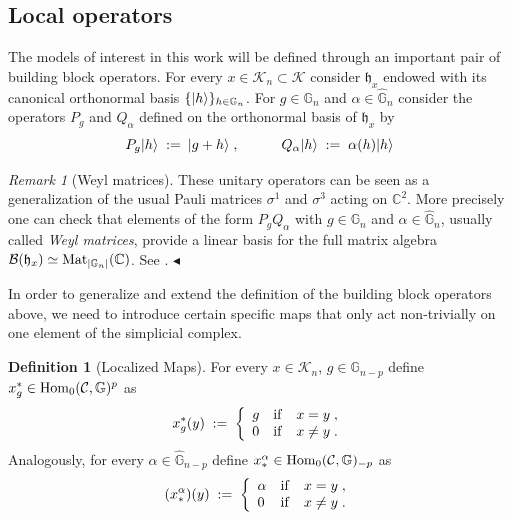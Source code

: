 \documentclass[a4paper,12pt,twoside,reqno]{amsart}
\DeclarePairedDelimiter\ket{\lvert}{\rangle}
\theoremstyle{plain}
\theoremstyle{definition}
\newtheorem{definition}[teo]{Definition}
\theoremstyle{remark}
\newtheorem{remark}[teo]{Remark}
\numberwithin{equation}{section}
\numberwithin{figure}{section}
\numberwithin{table}{section}
\newcommand{\f}[1]{\mathcal{#1}}
\newcommand{\n}[1]{\mathbb{#1}}
\begin{document}
	\subsection{Local operators}
	The models of interest in this work will be defined through an important pair of building block operators.
	For every  $x\in \f{K}_n\subset \f{K}$ consider $\mathfrak{h}_x$ endowed with its canonical
	orthonormal basis  $\{\ket{h}\}_{h\in \n{G}_n}$.
	For $g\in \n{G}_n$ and $\alpha\in \widehat{\n{G}}_n$ consider the operators $P_g$ and $Q_\alpha$
	defined on the orthonormal basis of $\mathfrak{h}_x$
	by
	\begin{equation*}
		P_g\ket{h}\;:=\:\ket{g+h}\;,\qquad\quad Q_{\alpha}\ket{h}\;:=\;\alpha(h)\ket{h}
	\end{equation*}
	
	
	
	
	
	
	
	\begin{remark}[Weyl matrices]\label{rk_lin_bas_mat}
		These unitary operators can be seen as a generalization of the usual Pauli matrices $\sigma^1$ and $\sigma^3$ acting on $\n{C}^2$.
		More precisely one can check that elements of the form $P_gQ_{\alpha}$ with $g\in \n{G}_n$ and $\alpha\in \widehat{\n{G}}_n$, usually called  \emph{Weyl matrices}, provide a linear basis for the full matrix algebra
		$\f{B}(\mathfrak{h}_x)\simeq{\rm Mat}_{|{\n{G}}_n|}(\n{C})$. See \cite[Lemma 3.2]{weil_operators}.
		\hfill $\blacktriangleleft$
	\end{remark}
	
	
	
	
	
	
	
	
	\medskip 
	
	
	
	
	
	
	
	
	In order to generalize and extend the definition of the building block operators above, we need to introduce
	certain specific maps that only act non-trivially on one element of the simplicial complex.
	\begin{definition}[Localized Maps]\label{def:localized maps}
		For every $x\in \f{K}_n$, $g\in \n{G}_{n-p}$ define $x^*_g\in {\rm Hom}_0(\f{C},\n{G})^p$ as 
		\begin{equation*}
			x^*_g(y)\;:=\;\left\{ \begin{array}{lcc} g & {\rm if} & x=y\;, \\ 
				0 & {\rm if} & x\not=y\;. \\  \end{array} \right.
		\end{equation*}
		Analogously, for every $\alpha\in \widehat{\n{G}}_{n-p}$ define $x_*^\alpha \in {\rm Hom}_0(\f{C},\n{G})_{-p}$ as
		\begin{equation*}
			( x_*^\alpha)(y)\;:=\;\left\{ \begin{array}{lcc} \alpha & {\rm if} & x=y\;, \\  0 & {\rm if} & x\not=y\;. \\   \end{array} \right.
		\end{equation*}
	\end{definition}
	
\end{document}
